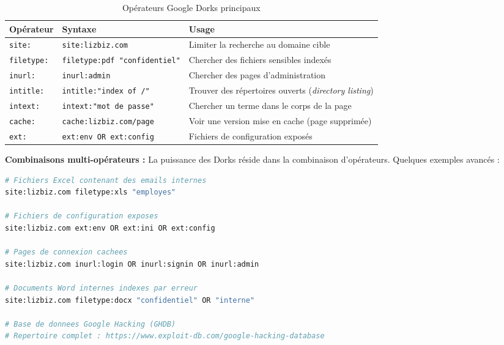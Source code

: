 \begin{table}[htbp]
\centering
\caption{Opérateurs Google Dorks principaux}
\label{tab:google_dorks}
\begin{tabular}{p{2.5cm}p{4.5cm}p{6cm}}
\toprule
\textbf{Opérateur} & \textbf{Syntaxe} & \textbf{Usage} \\
\midrule
\texttt{site:}
    & \texttt{site:lizbiz.com}
    & Limiter la recherche au domaine cible \\
\addlinespace
\texttt{filetype:}
    & \texttt{filetype:pdf "confidentiel"}
    & Chercher des fichiers sensibles indexés \\
\addlinespace
\texttt{inurl:}
    & \texttt{inurl:admin}
    & Chercher des pages d'administration \\
\addlinespace
\texttt{intitle:}
    & \texttt{intitle:"index of /"}
    & Trouver des répertoires ouverts (\textit{directory listing}) \\
\addlinespace
\texttt{intext:}
    & \texttt{intext:"mot de passe"}
    & Chercher un terme dans le corps de la page \\
\addlinespace
\texttt{cache:}
    & \texttt{cache:lizbiz.com/page}
    & Voir une version mise en cache (page supprimée) \\
\addlinespace
\texttt{ext:}
    & \texttt{ext:env OR ext:config}
    & Fichiers de configuration exposés \\
\bottomrule
\end{tabular}
\end{table}

\begin{boxinfo}
\textbf{Combinaisons multi-opérateurs :} La puissance des Dorks réside
dans la combinaison d'opérateurs. Quelques exemples avancés :
\begin{lstlisting}[language=bash]
# Fichiers Excel contenant des emails internes
site:lizbiz.com filetype:xls "employes"

# Fichiers de configuration exposes
site:lizbiz.com ext:env OR ext:ini OR ext:config

# Pages de connexion cachees
site:lizbiz.com inurl:login OR inurl:signin OR inurl:admin

# Documents Word internes indexes par erreur
site:lizbiz.com filetype:docx "confidentiel" OR "interne"

# Base de donnees Google Hacking (GHDB)
# Repertoire complet : https://www.exploit-db.com/google-hacking-database
\end{lstlisting}
\end{boxinfo}

